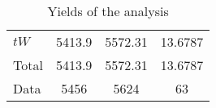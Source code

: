 \documentclass[10pt]{article}
\begin{document}
\begin{table}[htbp]
\begin{center}
\begin{tabular}{|l|S|S|S|}
\hline 
 & {} & {} & {}\\
\hline 
  $tW$   & 5413.9  & 5572.31  & 13.6787  \\ 
\hline 
  Total  & 5413.9  & 5572.31  & 13.6787  \\ 
\hline 
  Data   & 5456 & 5624 & 63 \\ 
\hline 
\end{tabular} 
\caption{Yields of the analysis} 
\end{center} 
\end{table} 
\end{document}

